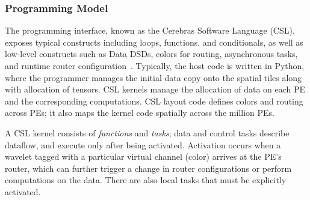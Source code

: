 \documentclass[conference]{IEEEtran}
\begin{document}
            \subsubsection{Programming Model}
                \label{sec:programmingmodel}
                The programming interface, known as the Cerebras Software Language (CSL), exposes typical constructs including loops, functions, and conditionals, as well as low-level constructs such as Data DSDs, %
                colors for routing, asynchronous tasks, and runtime router configuration~\cite{CSL}. Typically, %
                the host code is written in Python, where the programmer manages the initial data copy onto the spatial tiles along with allocation of tensors. %
                CSL kernels manage the allocation of data on each PE and the corresponding computations. CSL layout code defines colors and routing across PEs; it also maps the kernel code spatially across the million PEs.

                A CSL kernel consists of \textit{functions} and \textit{tasks}; data and control tasks describe dataflow, and execute only after being activated. %
                Activation occurs when a wavelet tagged with a particular virtual channel (color) arrives at the PE’s router, which can further trigger a change in router configurations or perform computations on the data. %
                There are also local tasks that must be explicitly activated. %
\end{document}
